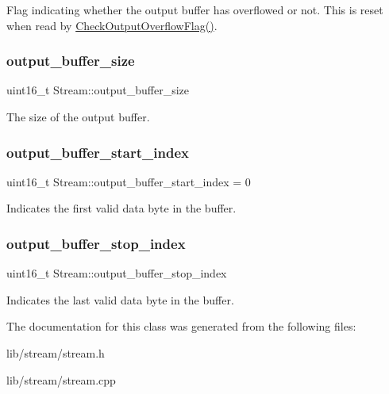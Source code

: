 Flag indicating whether the output buffer has overflowed or not. This is reset when read by \hyperlink{class_stream_aee6c201819b874c5934a270592d9d311}{Check\+Output\+Overflow\+Flag()}. \hypertarget{class_stream_a0e9fd6570bafb97ab76ebd37158e78ff}{}\label{class_stream_a0e9fd6570bafb97ab76ebd37158e78ff} 
\subsubsection{\texorpdfstring{output\+\_\+buffer\+\_\+size}{output\_buffer\_size}}
{\footnotesize\ttfamily uint16\+\_\+t Stream\+::output\+\_\+buffer\+\_\+size\hspace{0.3cm}{\ttfamily [protected]}}

The size of the output buffer. \hypertarget{class_stream_a1b2d63accede402e5c4c7fd3747d4c33}{}\label{class_stream_a1b2d63accede402e5c4c7fd3747d4c33} 
\subsubsection{\texorpdfstring{output\+\_\+buffer\+\_\+start\+\_\+index}{output\_buffer\_start\_index}}
{\footnotesize\ttfamily uint16\+\_\+t Stream\+::output\+\_\+buffer\+\_\+start\+\_\+index = 0\hspace{0.3cm}{\ttfamily [protected]}}

Indicates the first valid data byte in the buffer. \hypertarget{class_stream_a39d177eedd4d5ff28a95cca9131daf4c}{}\label{class_stream_a39d177eedd4d5ff28a95cca9131daf4c} 
\subsubsection{\texorpdfstring{output\+\_\+buffer\+\_\+stop\+\_\+index}{output\_buffer\_stop\_index}}
{\footnotesize\ttfamily uint16\+\_\+t Stream\+::output\+\_\+buffer\+\_\+stop\+\_\+index\hspace{0.3cm}{\ttfamily [protected]}}

Indicates the last valid data byte in the buffer. 

The documentation for this class was generated from the following files\+:\begin{DoxyCompactItemize}
\item 
lib/stream/stream.\+h\item 
lib/stream/stream.\+cpp\end{DoxyCompactItemize}
